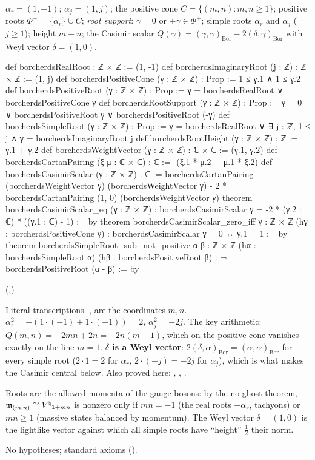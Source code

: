 \begin{definition}[Roots]\label{ch18:def:roots}
$\alpha_r=(1,-1)$; $\alpha_j=(1,j)$; the positive cone $C=\{(m,n):m,n\ge1\}$; positive roots $\Phi^+=\{\alpha_r\}\cup C$;
\emph{root support}: $\gamma=0$ or $\pm\gamma\in\Phi^+$; simple roots $\alpha_r$ and $\alpha_j$ ($j\ge1$); height $m+n$; the
Casimir scalar $Q(\gamma)=(\gamma,\gamma)_{\mathrm{Bor}}-2(\delta,\gamma)_{\mathrm{Bor}}$ with Weyl vector $\delta=(1,0)$.
\end{definition}
\begin{leancode}
def borcherdsRealRoot : ℤ × ℤ := (1, -1)
def borcherdsImaginaryRoot (j : ℤ) : ℤ × ℤ := (1, j)
def borcherdsPositiveCone (γ : ℤ × ℤ) : Prop := 1 ≤ γ.1 ∧ 1 ≤ γ.2
def borcherdsPositiveRoot (γ : ℤ × ℤ) : Prop :=
  γ = borcherdsRealRoot ∨ borcherdsPositiveCone γ
def borcherdsRootSupport (γ : ℤ × ℤ) : Prop :=
  γ = 0 ∨ borcherdsPositiveRoot γ ∨ borcherdsPositiveRoot (-γ)
def borcherdsSimpleRoot (γ : ℤ × ℤ) : Prop :=
  γ = borcherdsRealRoot ∨ ∃ j : ℤ, 1 ≤ j ∧ γ = borcherdsImaginaryRoot j
def borcherdsRootHeight (γ : ℤ × ℤ) : ℤ := γ.1 + γ.2
def borcherdsWeightVector (γ : ℤ × ℤ) : ℂ × ℂ := (γ.1, γ.2)
def borcherdsCartanPairing (ξ μ : ℂ × ℂ) : ℂ := -(ξ.1 * μ.2 + μ.1 * ξ.2)
def borcherdsCasimirScalar (γ : ℤ × ℤ) : ℂ :=
  borcherdsCartanPairing (borcherdsWeightVector γ) (borcherdsWeightVector γ) -
    2 * borcherdsCartanPairing (1, 0) (borcherdsWeightVector γ)
theorem borcherdsCasimirScalar_eq (γ : ℤ × ℤ) :
    borcherdsCasimirScalar γ = -2 * (γ.2 : ℂ) * ((γ.1 : ℂ) - 1) := by
theorem borcherdsCasimirScalar_zero_iff {γ : ℤ × ℤ} (hγ : borcherdsPositiveCone γ) :
    borcherdsCasimirScalar γ = 0 ↔ γ.1 = 1 := by
theorem borcherdsSimpleRoot_sub_not_positive {α β : ℤ × ℤ}
    (hα : borcherdsSimpleRoot α) (hβ : borcherdsPositiveRoot β) :
    ¬ borcherdsPositiveRoot (α - β) := by
\end{leancode}
(.)
\begin{dictionary}
Literal transcriptions.  ,  are the coordinates $m,n$.  $\alpha_r^2=-(1\cdot(-1)+1\cdot(-1))=2$,
$\alpha_j^2=-2j$.  The key arithmetic: $Q(m,n)=-2mn+2n=-2n(m-1)$, which on the positive cone vanishes exactly on the
line $m=1$.  \textbf{$\delta$ is a Weyl vector}: $2(\delta,\alpha)_{\mathrm{Bor}}=(\alpha,\alpha)_{\mathrm{Bor}}$ for every simple root ($2\cdot1=2$ for
$\alpha_r$, $2\cdot(-j)=-2j$ for $\alpha_j$), which is what makes the Casimir central below.  Also proved here:
, , .
\end{dictionary}
\begin{physics}
Roots are the allowed momenta of the gauge bosons: by the no-ghost theorem, $\mathfrak{m}_{(m,n)}\cong{V^{\natural}}_{1+mn}$ is nonzero
only if $mn=-1$ (the real roots $\pm\alpha_r$, tachyons) or $mn\ge1$ (massive states balanced by momentum).  The
Weyl vector $\delta=(1,0)$ is the lightlike vector against which all simple roots have ``height'' $\frac12$ their norm.
\end{physics}
\begin{status}No hypotheses; standard axioms ().\end{status}

